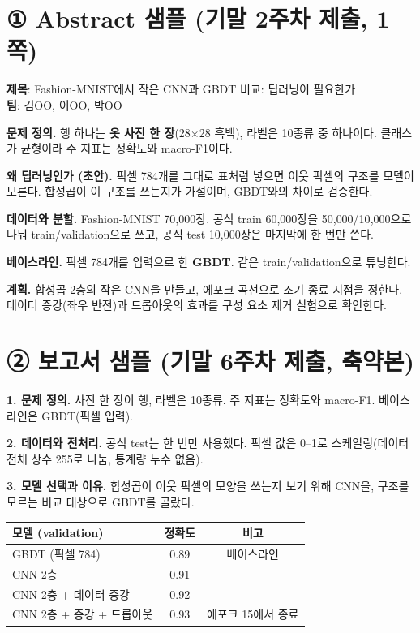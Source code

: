 \documentclass[11pt]{article}
\begin{document}


\section*{① Abstract 샘플 (기말 2주차 제출, 1쪽)}
\noindent\textbf{제목}: Fashion-MNIST에서 작은 CNN과 GBDT 비교: 딥러닝이 필요한가 \\
\textbf{팀}: 김OO, 이OO, 박OO

\vspace{4pt}
\noindent\textbf{문제 정의.} 행 하나는 \textbf{옷 사진 한 장}(28$\times$28 흑백), 라벨은 10종류 중 하나이다. 클래스가 균형이라 주 지표는 정확도와 macro-F1이다.

\noindent\textbf{왜 딥러닝인가 (초안).} 픽셀 784개를 그대로 표처럼 넣으면 이웃 픽셀의 구조를 모델이 모른다. 합성곱이 이 구조를 쓰는지가 가설이며, GBDT와의 차이로 검증한다.

\noindent\textbf{데이터와 분할.} Fashion-MNIST 70{,}000장. 공식 train 60{,}000장을 50{,}000/10{,}000으로 나눠 train/validation으로 쓰고, 공식 test 10{,}000장은 마지막에 한 번만 쓴다.

\noindent\textbf{베이스라인.} 픽셀 784개를 입력으로 한 \textbf{GBDT}. 같은 train/validation으로 튜닝한다.

\noindent\textbf{계획.} 합성곱 2층의 작은 CNN을 만들고, 에포크 곡선으로 조기 종료 지점을 정한다. 데이터 증강(좌우 반전)과 드롭아웃의 효과를 구성 요소 제거 실험으로 확인한다.

\newpage
\section*{② 보고서 샘플 (기말 6주차 제출, 축약본)}
\noindent\textbf{1. 문제 정의.} 사진 한 장이 행, 라벨은 10종류. 주 지표는 정확도와 macro-F1. 베이스라인은 GBDT(픽셀 입력).

\noindent\textbf{2. 데이터와 전처리.} 공식 test는 한 번만 사용했다. 픽셀 값은 0--1로 스케일링(데이터 전체 상수 255로 나눔, 통계량 누수 없음).

\noindent\textbf{3. 모델 선택과 이유.} 합성곱이 이웃 픽셀의 모양을 쓰는지 보기 위해 CNN을, 구조를 모르는 비교 대상으로 GBDT를 골랐다.

\begin{center}\small
\begin{tabular}{@{}lcc@{}}\toprule
모델 (validation) & 정확도 & 비고 \\\midrule
GBDT (픽셀 784) & 0.89 & 베이스라인 \\
CNN 2층 & 0.91 & \\
CNN 2층 + 데이터 증강 & 0.92 & \\
CNN 2층 + 증강 + 드롭아웃 & 0.93 & 에포크 15에서 종료 \\\bottomrule
\end{tabular}
\end{center}
\end{document}
